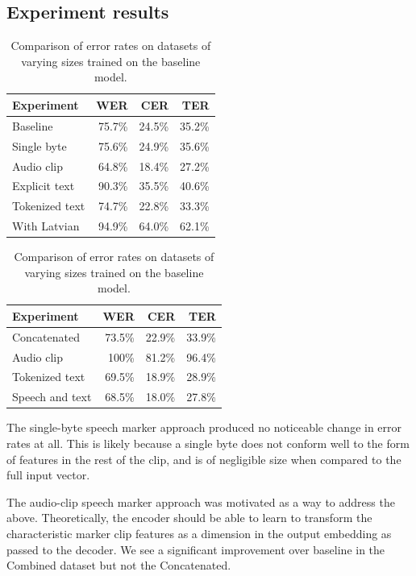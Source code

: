 \documentclass{article}
\begin{document}
  \subsection{Experiment results}
  \begin{table}
    \begin{center}
      \begin{tabular}{lrrr}
        \toprule
        Experiment     & WER    & CER    & TER \\\midrule
        Baseline       & 75.7\% & 24.5\% & 35.2\% \\
        Single byte    & 75.6\% & 24.9\% & 35.6\% \\
        Audio clip     & 64.8\% & 18.4\% & 27.2\% \\
        Explicit text  & 90.3\% & 35.5\% & 40.6\% \\
        Tokenized text & 74.7\% & 22.8\% & 33.3\% \\
        With Latvian   & 94.9\% & 64.0\% & 62.1\% \\\bottomrule
      \end{tabular}
      \begin{tabular}{lrrr}
        \toprule
        Experiment      & WER    & CER    & TER \\\midrule
        Concatenated    & 73.5\% & 22.9\% & 33.9\% \\
        Audio clip      & 100\%  & 81.2\% & 96.4\% \\
        Tokenized text  & 69.5\% & 18.9\% & 28.9\% \\
        Speech and text & 68.5\% & 18.0\% & 27.8\% \\\bottomrule
      \end{tabular}
    \end{center}
    \caption{Comparison of error rates on datasets of varying sizes trained on the baseline model.}
  \end{table}
  The single-byte speech marker approach produced no noticeable change in error rates at all. This is likely because a single byte does not conform well to the form of features in the rest of the clip, and is of negligible size when compared to the full input vector.

  The audio-clip speech marker approach was motivated as a way to address the above. Theoretically, the encoder should be able to learn to transform the characteristic marker clip features as a dimension in the output embedding as passed to the decoder. We see a significant improvement over baseline in the Combined dataset but not the Concatenated.
\end{document}
